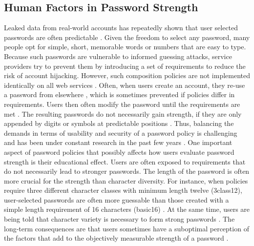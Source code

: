 
\subsection{Human Factors in Password Strength}
Leaked data from real-world accounts has repeatedly shown that user selected passwords are often predictable \cite{Bonneau2012ScienceOfGuessing}. Given the freedom to select any password, many people opt for simple, short, memorable words or numbers that are easy to type. Because such passwords are vulnerable to informed guessing attacks, service providers try to prevent them by introducing a set of requirements to reduce the risk of account hijacking. However, such composition policies are not implemented identically on all web services \cite{Wang2015EmperorsPolicies}. Often, when users create an account, they re-use a password from elsewhere \cite{Das2014TangledWeb}, which is sometimes prevented if policies differ in requirements. Users then often modify the password until the requirements are met \cite{Inglesant2010TrueCostOfUnusablePolicies,Komanduri2011OfPasswordsAndPeople}. The resulting passwords do not necessarily gain strength, if they are only appended by digits or symbols at predictable positions \cite{Weir2010MetricsPolicies}. Thus, balancing the demands in terms of usability and security of a password policy is challenging and has been under constant research in the past few years \cite{Melicher2016UsabilityMobileTextPasswords,
	Shay2016DesigningPasswordPolicies, 
	Shay2014CanLongPasswordsBeSecureAndUsable,
	Wang2015EmperorsPolicies}. One important aspect of password policies that possibly affects how users evaluate password strength is their educational effect. Users are often exposed to requirements that do not necessarily lead to stronger passwords. The length of the password is often more crucial for the strength than character diversity. For instance, when policies require three different character classes with minimum length twelve (3class12), user-selected passwords are often more guessable than those created with a simple length requirement of 16 characters (basic16) \cite{Shay2014CanLongPasswordsBeSecureAndUsable}. At the same time, users are being told that character variety is necessary to form strong passwords \cite{Ur2012HowDoesYourPasswordMeasureUp}. The long-term consequences are that users sometimes have a suboptimal perception of the factors that add to the objectively measurable strength of a password \cite{Ur2016PerceptionsPassword}. %




